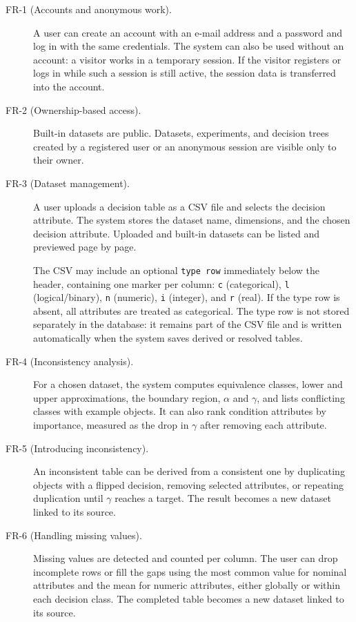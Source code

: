 \begin{description}

\item[FR-1 (Accounts and anonymous work).]
A user can create an account with an e-mail address and a password and log in
with the same credentials. The system can also be used without an account: a
visitor works in a temporary session. If the visitor registers or logs in while
such a session is still active, the session data is transferred into the account.

\item[FR-2 (Ownership-based access).]
Built-in datasets are public. Datasets, experiments, and decision trees created
by a registered user or an anonymous session are visible only to their owner.

\item[FR-3 (Dataset management).]
A user uploads a decision table as a CSV file and selects the decision attribute.
The system stores the dataset name, dimensions, and the chosen decision attribute.
Uploaded and built-in datasets can be listed and previewed page by page.

The CSV may include an optional \texttt{type row} immediately below the header,
containing one marker per column:
\texttt{c} (categorical), \texttt{l} (logical/binary), \texttt{n} (numeric),
\texttt{i} (integer), and \texttt{r} (real). If the type row is absent, all
attributes are treated as categorical. The type row is not stored separately in
the database: it remains part of the CSV file and is written automatically when
the system saves derived or resolved tables.

\item[FR-4 (Inconsistency analysis).]
For a chosen dataset, the system computes equivalence classes, lower and upper
approximations, the boundary region, $\alpha$ and $\gamma$, and lists conflicting
classes with example objects. It can also rank condition attributes by importance,
measured as the drop in $\gamma$ after removing each attribute.

\item[FR-5 (Introducing inconsistency).]
An inconsistent table can be derived from a consistent one by duplicating objects
with a flipped decision, removing selected attributes, or repeating duplication
until $\gamma$ reaches a target. The result becomes a new dataset linked to its
source.

\item[FR-6 (Handling missing values).]
Missing values are detected and counted per column. The user can drop incomplete
rows or fill the gaps using the most common value for nominal attributes and the
mean for numeric attributes, either globally or within each decision class. The
completed table becomes a new dataset linked to its source.


\end{description}
